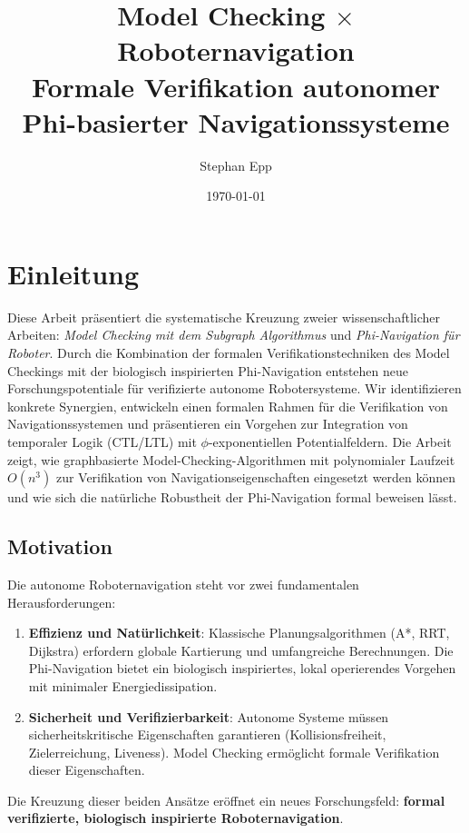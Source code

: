 ﻿\documentclass[a4paper,12pt]{article}
\title{Model Checking $\times$ Roboternavigation\\
	\large{Formale Verifikation autonomer Phi-basierter Navigationssysteme}}
\author{Stephan Epp}
\date{\today}
\theoremstyle{definition}
\begin{document}
	
\maketitle

\tableofcontents
\newpage

\section{Einleitung}

Diese Arbeit präsentiert die systematische Kreuzung zweier wissenschaftlicher Arbeiten: \textit{Model Checking mit dem Subgraph Algorithmus} und \textit{Phi-Navigation für Roboter}. Durch die Kombination der formalen Verifikationstechniken des Model Checkings mit der biologisch inspirierten Phi-Navigation entstehen neue Forschungspotentiale für verifizierte autonome Robotersysteme. Wir identifizieren konkrete Synergien, entwickeln einen formalen Rahmen für die Verifikation von Navigationssystemen und präsentieren ein Vorgehen zur Integration von temporaler Logik (CTL/LTL) mit $\phi$-exponentiellen Potentialfeldern. Die Arbeit zeigt, wie graphbasierte Model-Checking-Algorithmen mit polynomialer Laufzeit $O(n^3)$ zur Verifikation von Navigationseigenschaften eingesetzt werden können und wie sich die natürliche Robustheit der Phi-Navigation formal beweisen lässt.

\subsection{Motivation}

Die autonome Roboternavigation steht vor zwei fundamentalen Herausforderungen:

\begin{enumerate}
	\item \textbf{Effizienz und Natürlichkeit}: Klassische Planungsalgorithmen (A*, RRT, Dijkstra) erfordern globale Kartierung und umfangreiche Berechnungen. Die Phi-Navigation bietet ein biologisch inspiriertes, lokal operierendes Vorgehen mit minimaler Energiedissipation.
	
	\item \textbf{Sicherheit und Verifizierbarkeit}: Autonome Systeme müssen sicherheitskritische Eigenschaften garantieren (Kollisionsfreiheit, Zielerreichung, Liveness). Model Checking ermöglicht formale Verifikation dieser Eigenschaften.
\end{enumerate}

Die Kreuzung dieser beiden Ansätze eröffnet ein neues Forschungsfeld: \textbf{formal verifizierte, biologisch inspirierte Roboternavigation}.
\end{document}
